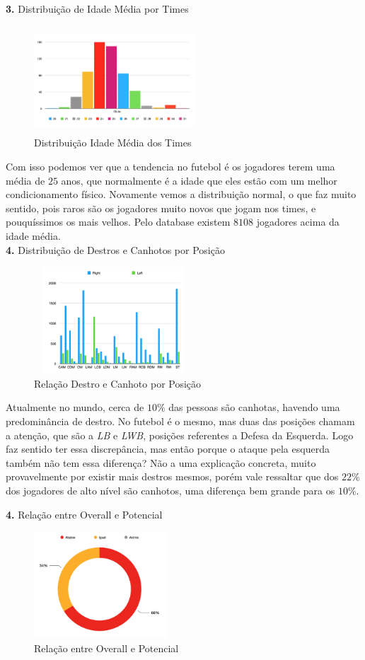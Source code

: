 \documentclass{article}
\begin{document}
\textbf{3.} Distribuição de Idade Média por Times
\begin{figure}[H]
    \centering
    \includegraphics[width=6cm,height=4cm]{Distribuição de Idade Média dos Times.png}
    \caption{Distribuição Idade Média dos Times}
    \label{fig:my_label}
\end{figure}
Com isso podemos ver que a tendencia no futebol é os jogadores terem uma média de $25$ anos, que normalmente é a idade que eles estão com um melhor condicionamento físico. Novamente vemos a distribuição normal, o que faz muito sentido, pois raros são os jogadores muito novos que jogam nos times, e pouquíssimos os mais velhos. Pelo database existem $8108$ jogadores acima da idade média.\\

\textbf{4.} Distribuição de Destros e Canhotos por Posição
\begin{figure}[H]
    \centering
    \includegraphics[width=6cm,height=4cm]{Relação Destro e Canhoto por Posição.png}
    \caption{Relação Destro e Canhoto por Posição}
    \label{fig:my_label}
\end{figure}
Atualmente no mundo, cerca de $10\%$ das pessoas são canhotas, havendo uma predominância de destro. No futebol é o mesmo, mas duas das posições chamam a atenção, que são a \textit{LB} e\textit{ LWB}, posições referentes a Defesa da Esquerda. Logo faz sentido ter essa discrepância, mas então porque o ataque pela esquerda também não tem essa diferença? Não a uma explicação concreta, muito provavelmente por existir mais destros mesmos, porém vale ressaltar que dos $22\% $ dos jogadores de alto nível são canhotos, uma diferença bem grande para os $10\%$.

\newpage
\textbf{4.} Relação entre Overall e Potencial
\begin{figure}[H]
    \centering
    \includegraphics[width=5cm,height=4cm]{Relação entre Overall e Potencial.png}
    \caption{ Relação entre Overall e Potencial}
    \label{fig:my_label}
\end{figure}
\end{document}
